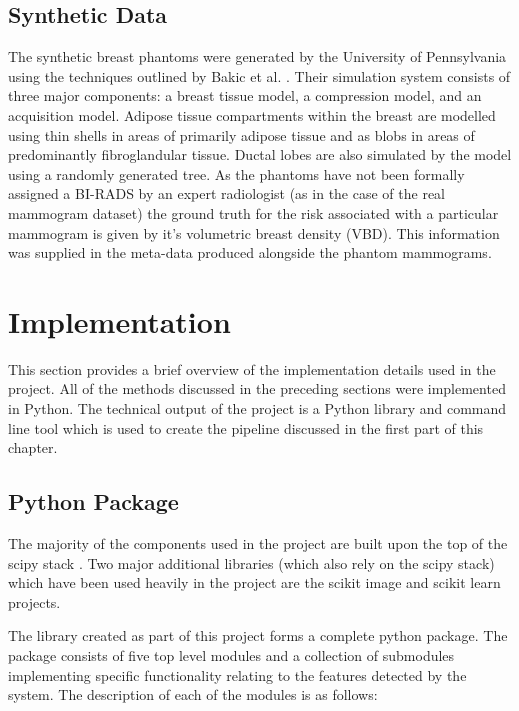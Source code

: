 \subsection{Synthetic Data}
The synthetic breast phantoms were generated by the University of Pennsylvania using the techniques outlined by Bakic et al. \cite{bakic2002mammogram1, bakic2002mammogram2, bakic2003mammogram3}. Their simulation system consists of three major components: a breast tissue model, a compression model, and an acquisition model. Adipose tissue compartments within the breast are modelled using thin shells in areas of primarily adipose tissue and as blobs in areas of predominantly fibroglandular tissue. Ductal lobes are also simulated by the model using a randomly generated tree. As the phantoms have not been formally assigned a BI-RADS by an expert radiologist (as in the case of the real mammogram dataset) the ground truth for the risk associated with a particular mammogram is given by it's volumetric breast density (VBD). This information was supplied in the meta-data produced alongside the phantom mammograms.

\section{Implementation}
\label{sec:implementation}
This section provides a brief overview of the implementation details used in the project. All of the methods discussed in the preceding sections were implemented in Python. The technical output of the project is a Python library and command line tool which is used to create the pipeline discussed in the first part of this chapter.

\subsection{Python Package}
The majority of the components used in the project are built upon the top of the scipy stack \cite{jones2014scipy}. Two major additional libraries (which also rely on the scipy stack) which have been used heavily in the project are the scikit image \cite{van2014scikit} and scikit learn \cite{pedregosa2011scikit} projects.

The library created as part of this project forms a complete python package. The package consists of five top level modules and a collection of submodules implementing specific functionality relating to the features detected by the system. The description of each of the modules is as follows:

